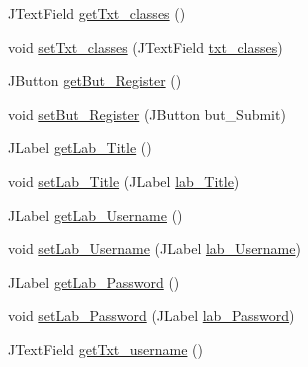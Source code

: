 \begin{DoxyCompactItemize}
\item 
J\+Text\+Field \mbox{\hyperlink{classcom_1_1_b_n_u_1_1pages_1_1register_1_1_register_model_a0df75861ea14d734bdc1fa80b353e404}{get\+Txt\+\_\+classes}} ()
\item 
void \mbox{\hyperlink{classcom_1_1_b_n_u_1_1pages_1_1register_1_1_register_model_ab770f3b5024c66fc19ca7bf8f1d48a74}{set\+Txt\+\_\+classes}} (J\+Text\+Field \mbox{\hyperlink{classcom_1_1_b_n_u_1_1pages_1_1register_1_1_register_model_ae3507f1c61e56eac0a2bf9191d699e59}{txt\+\_\+classes}})
\item 
J\+Button \mbox{\hyperlink{classcom_1_1_b_n_u_1_1pages_1_1register_1_1_register_model_a169cf8776ea26ac34fc194b727461e67}{get\+But\+\_\+\+Register}} ()
\item 
void \mbox{\hyperlink{classcom_1_1_b_n_u_1_1pages_1_1register_1_1_register_model_a38cfa97cad36d970d027649ce26e67d2}{set\+But\+\_\+\+Register}} (J\+Button but\+\_\+\+Submit)
\item 
J\+Label \mbox{\hyperlink{classcom_1_1_b_n_u_1_1pages_1_1register_1_1_register_model_ae90ec5bef2163b788483bf3c7eae7f50}{get\+Lab\+\_\+\+Title}} ()
\item 
void \mbox{\hyperlink{classcom_1_1_b_n_u_1_1pages_1_1register_1_1_register_model_afa99525c951367f3512a7f2243c5abe6}{set\+Lab\+\_\+\+Title}} (J\+Label \mbox{\hyperlink{classcom_1_1_b_n_u_1_1pages_1_1register_1_1_register_model_a72295777d735789685fe157be1c17e80}{lab\+\_\+\+Title}})
\item 
J\+Label \mbox{\hyperlink{classcom_1_1_b_n_u_1_1pages_1_1register_1_1_register_model_ab2c47b8faf8d3e867b2877845fe4e2db}{get\+Lab\+\_\+\+Username}} ()
\item 
void \mbox{\hyperlink{classcom_1_1_b_n_u_1_1pages_1_1register_1_1_register_model_a134d1cb832a10c06aa02383b5cdf4ca6}{set\+Lab\+\_\+\+Username}} (J\+Label \mbox{\hyperlink{classcom_1_1_b_n_u_1_1pages_1_1register_1_1_register_model_a5e363008f35e3b9465fd1d77f0eda6e0}{lab\+\_\+\+Username}})
\item 
J\+Label \mbox{\hyperlink{classcom_1_1_b_n_u_1_1pages_1_1register_1_1_register_model_a3cad4715494f385a659ec71675cb8b26}{get\+Lab\+\_\+\+Password}} ()
\item 
void \mbox{\hyperlink{classcom_1_1_b_n_u_1_1pages_1_1register_1_1_register_model_a4849549a6976e3d799a4f2d01b56ebd5}{set\+Lab\+\_\+\+Password}} (J\+Label \mbox{\hyperlink{classcom_1_1_b_n_u_1_1pages_1_1register_1_1_register_model_abc3cb35cf6ce21e912be075795af002d}{lab\+\_\+\+Password}})
\item 
J\+Text\+Field \mbox{\hyperlink{classcom_1_1_b_n_u_1_1pages_1_1register_1_1_register_model_a80c8aed0aa4e1fcf231bcd18c7c67b3f}{get\+Txt\+\_\+username}} ()

\end{DoxyCompactItemize}
